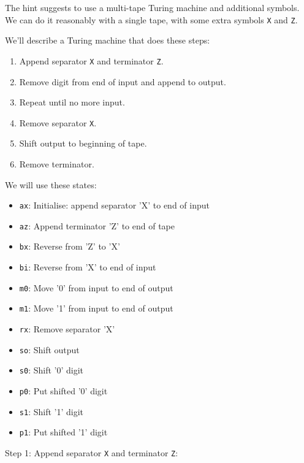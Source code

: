 \documentclass[12pt]{extarticle}
\begin{document}

The hint suggests to use a multi-tape Turing machine and additional symbols.
We can do it reasonably with a single tape, with some extra symbols \texttt{X} and \texttt{Z}.

We'll describe a Turing machine that does these steps:
\begin{enumerate}
    \item Append separator \texttt{X} and terminator \texttt{Z}.
    \item Remove digit from end of input and append to output.
    \item Repeat until no more input.
    \item Remove separator \texttt{X}.
    \item Shift output to beginning of tape.
    \item Remove terminator.
\end{enumerate}

We will use these states:
\begin{itemize}
    \item \texttt{ax}: Initialise: append separator 'X' to end of input
    \item \texttt{az}: Append terminator 'Z' to end of tape
    \item \texttt{bx}: Reverse from 'Z' to 'X'
    \item \texttt{bi}: Reverse from 'X' to end of input
    \item \texttt{m0}: Move '0' from input to end of output
    \item \texttt{m1}: Move '1' from input to end of output
    \item \texttt{rx}: Remove separator 'X'
    \item \texttt{so}: Shift output
    \item \texttt{s0}: Shift '0' digit
    \item \texttt{p0}: Put shifted '0' digit
    \item \texttt{s1}: Shift '1' digit
    \item \texttt{p1}: Put shifted '1' digit
\end{itemize}

Step 1: Append separator \texttt{X} and terminator \texttt{Z}:
\end{document}
